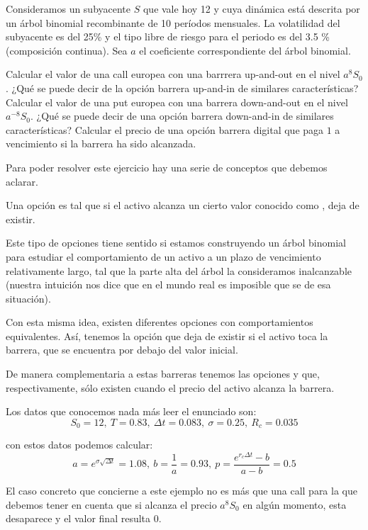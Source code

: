 \begin{problem}[2]
Consideramos un subyacente $S$ que vale hoy 12 y cuya dinámica está descrita por un árbol binomial recombinante de 10 períodos mensuales. La volatilidad del subyacente es del 25\% y el tipo libre de riesgo para el periodo es del 3.5 \% (composición continua). Sea $a$ el coeficiente correspondiente del árbol binomial.

\ppart Calcular el valor de una call europea con una barrrera up-and-out en el nivel $a^8S_0$.
\ppart ¿Qué se puede decir de la opción barrera up-and-in de similares características?
\ppart Calcular el valor de una put europea con una barrera down-and-out en el nivel $a^{-8}S_0$.
\ppart ¿Qué se puede decir de una opción barrera down-and-in de similares características?
\ppart Calcular el precio de una opción barrera digital que paga $1$ a vencimiento si la barrera ha sido alcanzada.

\solution


Para poder resolver este ejercicio hay una serie de conceptos que debemos aclarar.

Una opción  es tal que si el activo alcanza un cierto valor conocido como , deja de existir.

Este tipo de opciones tiene sentido si estamos construyendo un árbol binomial para estudiar el comportamiento de un activo a un plazo de vencimiento relativamente largo, tal que la parte alta del árbol la consideramos inalcanzable (nuestra intuición nos dice que en el mundo real es imposible que se de esa situación).

Con esta misma idea, existen diferentes opciones con comportamientos equivalentes. Así, tenemos la opción  que deja de existir si el activo toca la barrera, que se encuentra por debajo del valor inicial.

De manera complementaria a estas barreras tenemos las opciones  y  que, respectivamente, sólo existen cuando el precio del activo alcanza la barrera.


Los datos que conocemos nada más leer el enunciado son:
\[S_0=12, \ T=0.83, \ Δt = 0.083, \ σ=0.25, \ R_c=0.035\]

con estos datos podemos calcular:
\[a=e^{σ\sqrt{Δt}} = 1.08, \ b = \frac{1}{a} = 0.93, \ p = \frac{e^{r_cΔt}-b}{a-b}=0.5\]

\spart

El caso concreto que concierne a este ejemplo no es más que una call para la que debemos tener en cuenta que si alcanza el precio $a^8S_0$ en algún momento, esta desaparece y el valor final resulta 0.


\end{problem}

